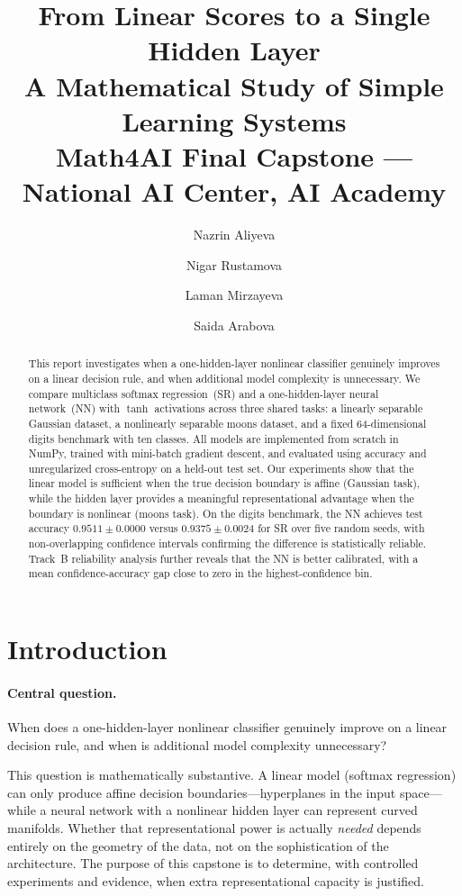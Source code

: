 \documentclass[11pt]{article}
\title{\textbf{From Linear Scores to a Single Hidden Layer}\\[0.4em]
\large A Mathematical Study of Simple Learning Systems\\[0.3em]
\normalsize Math4AI Final Capstone --- National AI Center, AI Academy}
\author{Nazrin Aliyeva \and Nigar Rustamova \and Laman Mirzayeva \and Saida Arabova}
\date{}
\begin{document}
\maketitle

\begin{abstract}
This report investigates when a one-hidden-layer nonlinear classifier genuinely improves
on a linear decision rule, and when additional model complexity is unnecessary.
We compare multiclass softmax regression~(SR) and a one-hidden-layer neural network~(NN)
with $\tanh$ activations across three shared tasks: a linearly separable Gaussian dataset,
a nonlinearly separable moons dataset, and a fixed 64-dimensional digits benchmark with ten
classes.
All models are implemented from scratch in NumPy, trained with mini-batch gradient descent,
and evaluated using accuracy and unregularized cross-entropy on a held-out test set.
Our experiments show that the linear model is sufficient when the true decision boundary
is affine (Gaussian task), while the hidden layer provides a meaningful representational
advantage when the boundary is nonlinear (moons task).
On the digits benchmark, the NN achieves test accuracy $0.9511 \pm 0.0000$ versus
$0.9375 \pm 0.0024$ for SR over five random seeds, with non-overlapping confidence
intervals confirming the difference is statistically reliable.
Track~B reliability analysis further reveals that the NN is better calibrated, with a
mean confidence-accuracy gap close to zero in the highest-confidence bin.
\end{abstract}

\newpage
\tableofcontents
\newpage

\section{Introduction}

\paragraph{Central question.}
When does a one-hidden-layer nonlinear classifier genuinely improve on a linear decision
rule, and when is additional model complexity unnecessary?

This question is mathematically substantive.
A linear model (softmax regression) can only produce affine decision boundaries---hyperplanes
in the input space---while a neural network with a nonlinear hidden layer can represent
curved manifolds.
Whether that representational power is actually \emph{needed} depends entirely on the
geometry of the data, not on the sophistication of the architecture.
The purpose of this capstone is to determine, with controlled experiments and evidence,
when extra representational capacity is justified.
\end{document}
